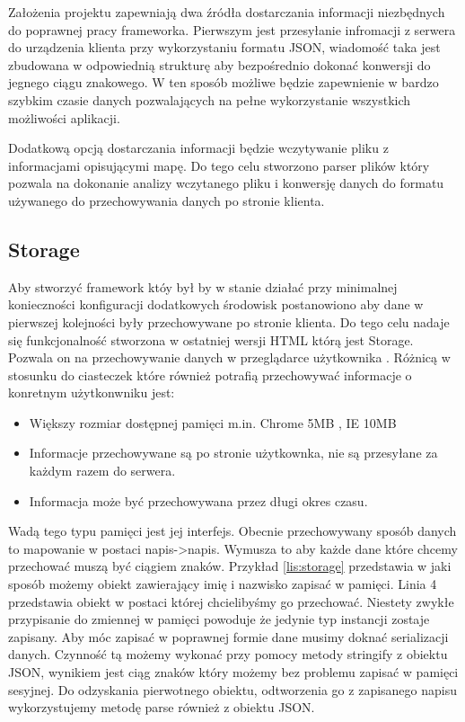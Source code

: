 Założenia projektu zapewniają dwa źródła dostarczania informacji niezbędnych do poprawnej pracy frameworka.
Pierwszym jest przesyłanie infromacji z serwera do urządzenia klienta przy wykorzystaniu formatu JSON, wiadomość taka jest zbudowana w odpowiednią strukturę aby bezpośrednio dokonać konwersji do jegnego ciągu znakowego. W ten sposób możliwe będzie zapewnienie w bardzo szybkim czasie danych pozwalających na pełne wykorzystanie wszystkich możliwości aplikacji.

Dodatkową opcją dostarczania informacji będzie wczytywanie pliku z informacjami opisującymi mapę. Do tego celu stworzono parser plików który pozwala na dokonanie analizy wczytanego pliku i konwersję danych do formatu używanego do przechowywania danych po stronie klienta.

\subsection{Storage}
\label{subsec:storage5}
Aby stworzyć framework któy był by w stanie działać przy minimalnej konieczności konfiguracji dodatkowych środowisk postanowiono aby dane w pierwszej kolejności były przechowywane po stronie klienta. Do tego celu nadaje się funkcjonalność stworzona w ostatniej wersji HTML którą jest Storage. Pozwala on na przechowywanie danych w przeglądarce użytkownika \cite{html5dive}. Różnicą w stosunku do ciasteczek które również potrafią przechowywać informacje o konretnym użytkonwniku jest:
\begin{itemize}
\item
Większy rozmiar dostępnej pamięci m.in. Chrome 5MB \nocite{chrome5mb}, IE 10MB
\item
Informacje przechowywane są po stronie użytkownka, nie są przesyłane za każdym razem do serwera.
\item
Informacja może być przechowywana przez długi okres czasu.
\end{itemize}

Wadą tego typu pamięci jest jej interfejs. Obecnie przechowywany sposób danych to mapowanie w postaci napis->napis. Wymusza to aby każde dane które chcemy przechować muszą być ciągiem znaków. Przykład \ref{lis:storage} przedstawia w jaki sposób możemy obiekt zawierający imię i nazwisko zapisać w pamięci. Linia 4 przedstawia obiekt w postaci której chcielibyśmy go przechować. Niestety zwykłe przypisanie do zmiennej w pamięci powoduje że jedynie typ instancji zostaje zapisany. Aby móc zapisać w poprawnej formie dane musimy doknać serializacji danych. Czynność tą możemy wykonać przy pomocy metody stringify z obiektu JSON, wynikiem jest ciąg znaków który możemy bez problemu zapisać w pamięci sesyjnej. Do odzyskania pierwotnego obiektu, odtworzenia go z zapisanego napisu wykorzystujemy metodę parse również z obiektu JSON.

